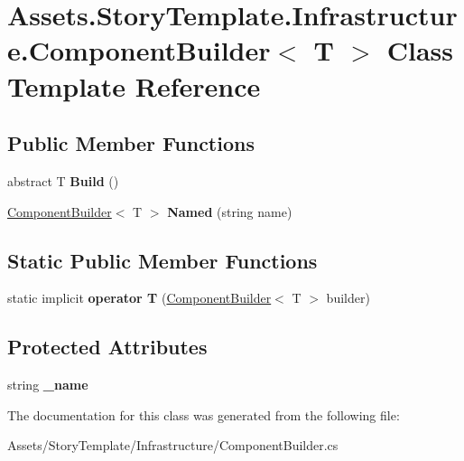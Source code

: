 \hypertarget{classAssets_1_1StoryTemplate_1_1Infrastructure_1_1ComponentBuilder}{}\section{Assets.\+Story\+Template.\+Infrastructure.\+Component\+Builder$<$ T $>$ Class Template Reference}
\label{classAssets_1_1StoryTemplate_1_1Infrastructure_1_1ComponentBuilder}
\subsection*{Public Member Functions}
\begin{DoxyCompactItemize}
\item 
abstract T {\bfseries Build} ()\hypertarget{classAssets_1_1StoryTemplate_1_1Infrastructure_1_1ComponentBuilder_ae3e56159245f132fb6eac62c07d7432a}{}\label{classAssets_1_1StoryTemplate_1_1Infrastructure_1_1ComponentBuilder_ae3e56159245f132fb6eac62c07d7432a}

\item 
\hyperlink{classAssets_1_1StoryTemplate_1_1Infrastructure_1_1ComponentBuilder}{Component\+Builder}$<$ T $>$ {\bfseries Named} (string name)\hypertarget{classAssets_1_1StoryTemplate_1_1Infrastructure_1_1ComponentBuilder_ab0895f57ec6870bcad300292d984dc97}{}\label{classAssets_1_1StoryTemplate_1_1Infrastructure_1_1ComponentBuilder_ab0895f57ec6870bcad300292d984dc97}

\end{DoxyCompactItemize}
\subsection*{Static Public Member Functions}
\begin{DoxyCompactItemize}
\item 
static implicit {\bfseries operator T} (\hyperlink{classAssets_1_1StoryTemplate_1_1Infrastructure_1_1ComponentBuilder}{Component\+Builder}$<$ T $>$ builder)\hypertarget{classAssets_1_1StoryTemplate_1_1Infrastructure_1_1ComponentBuilder_ad16388117e08aa0738d907e19cfac536}{}\label{classAssets_1_1StoryTemplate_1_1Infrastructure_1_1ComponentBuilder_ad16388117e08aa0738d907e19cfac536}

\end{DoxyCompactItemize}
\subsection*{Protected Attributes}
\begin{DoxyCompactItemize}
\item 
string {\bfseries \+\_\+name}\hypertarget{classAssets_1_1StoryTemplate_1_1Infrastructure_1_1ComponentBuilder_ab68594f48f44b7f90a875b3f2e5b0d95}{}\label{classAssets_1_1StoryTemplate_1_1Infrastructure_1_1ComponentBuilder_ab68594f48f44b7f90a875b3f2e5b0d95}

\end{DoxyCompactItemize}


The documentation for this class was generated from the following file\+:\begin{DoxyCompactItemize}
\item 
Assets/\+Story\+Template/\+Infrastructure/Component\+Builder.\+cs\end{DoxyCompactItemize}
